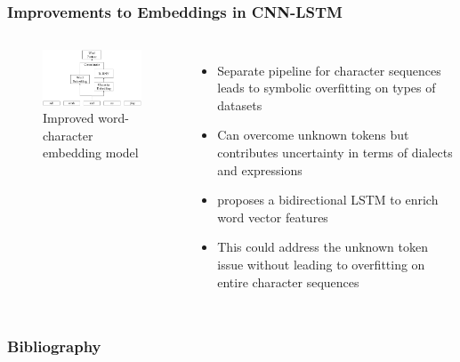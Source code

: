 \documentclass{beamer}
\begin{document}
\subsection{}
\begin{framefont}{\footnotesize}
	\begin{frame}
		\frametitle{Improvements to Embeddings in CNN-LSTM}
		\vspace{-10pt}
		\begin{columns}
			\centering
			\begin{figure}
				\captionsetup{justification=centering}
				\includegraphics[width=4.5cm]{improved_rnn.png}
				\caption{Improved word-character embedding model \parencite{improvedRNN}}
			\end{figure}
			\begin{itemize}
				\setlength\itemsep{1.5em}
				\item Separate pipeline for character sequences leads to symbolic overfitting on types of datasets
				\item Can overcome unknown tokens but contributes uncertainty in terms of dialects and expressions
				\item \textcite{improvedRNN} proposes a bidirectional LSTM to enrich word vector features
				\item This could address the unknown token issue without leading to overfitting on entire character sequences
			\end{itemize}
		\end{columns}
	\end{frame}
\end{framefont}

\begin{frame}[allowframebreaks]
	\frametitle{Bibliography}
	\nocite{*}
	\printbibliography[title = {Bibliography}]
\end{frame}
\end{document}

